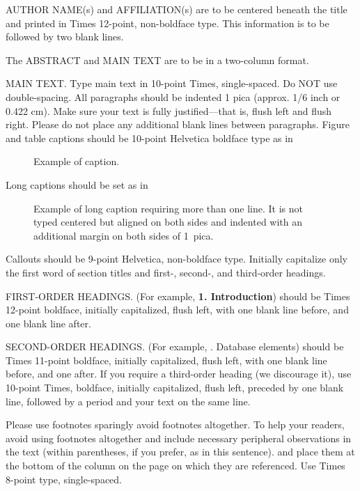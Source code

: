 \documentclass[times, 10pt,twocolumn]{article}
\begin{document}
AUTHOR NAME(s) and AFFILIATION(s) are to be centered beneath the title and
printed in Times 12-point, non-boldface type.  This information is to be
followed by two blank lines.

The ABSTRACT and MAIN TEXT are to be in a two-column format. 

MAIN TEXT. Type main text in 10-point Times, single-spaced.  Do NOT use
double-spacing. All paragraphs should be indented 1 pica (approx. 1/6 inch
or 0.422 cm). Make sure your text is fully justified---that is, flush left
and flush right.  Please do not place any additional blank lines between
paragraphs.  Figure and table captions should be 10-point Helvetica
boldface type as in \begin{figure}[h] \caption{Example of caption.}
\end{figure}

\noindent Long captions should be set as in \begin{figure}[h]
	\caption{Example of long caption requiring more than one line. It is not
	typed centered but aligned on both sides and indented with an additional
margin on both sides of 1~pica.} \end{figure}

\noindent Callouts should be 9-point Helvetica, non-boldface type.
Initially capitalize only the first word of section titles and first-,
second-, and third-order headings.

FIRST-ORDER HEADINGS. (For example, {\large \bf 1.  Introduction}) should
be Times 12-point boldface, initially capitalized, flush left, with one
blank line before, and one blank line after.

SECOND-ORDER HEADINGS. (For example, {. Database elements})
should be Times 11-point boldface, initially capitalized, flush left, with
one blank line before, and one after. If you require a third-order heading
(we discourage it), use 10-point Times, boldface, initially capitalized,
flush left, preceded by one blank line, followed by a period and your text
on the same line.


Please use footnotes sparingly%
	avoid footnotes altogether.  To help your readers, avoid using footnotes
	altogether and include necessary peripheral observations in the text
	(within parentheses, if you prefer, as in this sentence). and place them
	at the bottom of the column on the page on which they are referenced.
	Use Times 8-point type, single-spaced.
\end{document}
